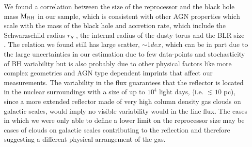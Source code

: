 We found a correlation between the size of the reprocessor and the black hole mass ${\rm M}_{\rm BH}$ in our sample, which is consistent with other AGN properties which scale with the mass of the black hole and accretion rate, which include the Schwarzschild radius $r_S$ \citep{1916AbhKP1916..189S}, the internal radius of the dusty torus \citep{2014ApJ...788..159K} and the BLR size \citep{2020MNRAS.491.5881Y}. The relation we found still has large scatter, $\sim1 dex$, which can be in part due to the large uncertainties in our estimation due to few data-points and stochasticity of BH variability but is also probably due to other physical factors like more complex geometries and AGN type dependent imprints that affect our measurements. The variability in the \kalfa{} flux guarantees that the reflector is located in the nuclear surroundings with a size of up to $10^4$ light days, (i.e. $\lesssim10$ pc), since a more extended reflector made of very high column density gas clouds on galactic scales, would imply no visible variability would in the \kalfa{} line flux. The cases in which we were only able to define a lower limit on the reprocessor size may be cases of clouds on galactic scales contributing to the reflection and therefore suggesting a different physical arrangement of the gas.
